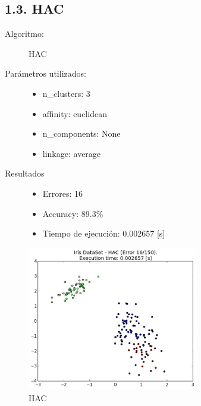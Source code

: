 \documentclass{article}
\begin{document}
\subsection*{1.3. \; HAC}
\begin{description}
  \item[Algoritmo:] HAC
  \item[Parámetros utilizados:] \hfill
    \begin{itemize}
      \item n\_clusters: 3
      \item affinity: euclidean
      \item n\_components: None
      \item linkage: average
    \end{itemize}
  \item[Resultados]\hfill
    \begin{itemize}
      \item Errores: 16
      \item Accuracy:  89.3\%
      \item Tiempo de ejecución: 0.002657 [s]
    \end{itemize}
\end{description}

\begin{figure}[H]
  \centering
  \includegraphics[width=0.666\textwidth]{img/HAC.png}
  \caption{HAC}
\end{figure}

\newpage
\end{document}
